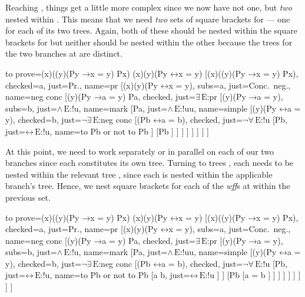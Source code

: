 \documentclass[10pt,british,a4paper,doc2]{ltxdoc}
\newcommand*{\lif}{\ensuremath{\mathbin{\rightarrow}}}
\newcommand*{\liff}{\ensuremath{\mathbin{\leftrightarrow}}}
\newcommand*{\elim}{\,\text{E}}
\newcommand*\wff{\emph{wff}}
\begin{document}
Reaching \nyth*{}, things get a little more complex since we now have not one, but \emph{two} \bocsnyth{} nested within \nyth[7].
This means that we need \emph{two} sets of square brackets for \nyth{} --- one for each of its two trees.
Again, both of these should be nested within the square brackets for \nyth[7] but neither should be nested within the other because the trees for the two branches at \nyth{} are distinct.
\begin{latexcode}
\begin{tableau}
  {
    to prove={(\exists x)((\forall y)(Py \lif x = y) \land Px) \sststile{}{} (\exists x)(\forall y)(Py \liff x = y)}
  }
  [{(\exists x)((\forall y)(Py \lif x = y) \land Px)}, checked=a, just=Pr., name=pr
    [{\lnot (\exists x)(\forall y)(Py \liff x = y)}, subs=a, just=Conc.~neg., name=neg conc
      [{(\forall y)(Py \lif a = y) \land Pa}, checked, just=$\exists\elim$:pr
        [{(\forall y)(Py \lif a = y)}, subs=b, just=$\land\elim$:!u, name=mark
          [Pa, just=$\land\elim$:!uu, name=simple
            [{\lnot (\forall y)(Py \liff a = y)}, checked=b, just=$\lnot\exists\elim$:neg conc
              [{\lnot (Pb \liff a = b)}, checked, just=$\lnot\forall\elim$:!u
                [Pb, just=$\liff\elim$:!u, name=to Pb or not to Pb
                ]
                [\lnot Pb
                ]
              ]
            ]
          ]
        ]
      ]
    ]
  ]
\end{tableau}
\end{latexcode}

At this point, we need to work separately or in parallel on each of our two branches since each constitutes its own tree.
Turning to trees \nyth*{}, each needs to be nested within the relevant tree \nyth[8], since each \bocsnyth{} is nested within the applicable branch's tree.
Hence, we nest square brackets for each of the \wff{}s at \nyth{} within the previous set.
\begin{latexcode}
\begin{tableau}
  {
    to prove={(\exists x)((\forall y)(Py \lif x = y) \land Px) \sststile{}{} (\exists x)(\forall y)(Py \liff x = y)}
  }
  [{(\exists x)((\forall y)(Py \lif x = y) \land Px)}, checked=a, just=Pr., name=pr
    [{\lnot (\exists x)(\forall y)(Py \liff x = y)}, subs=a, just=Conc.~neg., name=neg conc
      [{(\forall y)(Py \lif a = y) \land Pa}, checked, just=$\exists\elim$:pr
        [{(\forall y)(Py \lif a = y)}, subs=b, just=$\land\elim$:!u, name=mark
          [Pa, just=$\land\elim$:!uu, name=simple
            [{\lnot (\forall y)(Py \liff a = y)}, checked=b, just=$\lnot\exists\elim$:neg conc
              [{\lnot (Pb \liff a = b)}, checked, just=$\lnot\forall\elim$:!u
                [Pb, just=$\liff\elim$:!u, name=to Pb or not to Pb
                 [a \neq b, just=$\liff\elim$:!u
                 ]
                ]
                [\lnot Pb
                 [{a = b}
                 ]
                ]
              ]
            ]
          ]
        ]
      ]
    ]
  ]
\end{tableau}
\end{latexcode}
\end{document}
